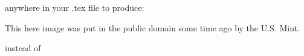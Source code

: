 \documentclass[pagesize=auto]{scrartcl}
\begin{document}
anywhere in your .tex file to produce:
\makeatletter
\renewcommand{\CRB@setcopyrightparagraphstyle}{%
\setlength{\rightskip}{0pt}
\setlength{\leftskip}{0pt}
}

\makeatother
\begin{center}
      {This here image was put in the public domain some time ago by the U.S. Mint.}
\end{center}

instead of 

\makeatletter
\renewcommand{\CRB@setcopyrightparagraphstyle}{%
\raggedright
}
\end{document}
